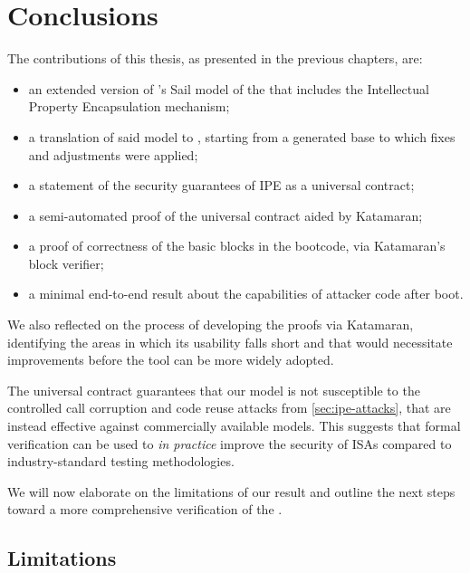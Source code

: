 \chapter{Conclusions}
\label{ch:conclusions}

The contributions of this thesis, as presented in the previous chapters, are:
\begin{itemize}
\item an extended version of \cite{mspthesis}'s Sail model of the \msp that includes the Intellectual Property Encapsulation mechanism;
\item a translation of said model to \usail, starting from a generated base to which fixes and adjustments were applied;
\item a statement of the security guarantees of IPE as a universal contract;
\item a semi-automated proof of the universal contract aided by Katamaran;
\item a proof of correctness of the basic blocks in the \msp bootcode, via Katamaran's block verifier;
\item a minimal end-to-end result about the capabilities of attacker code after boot.
\end{itemize}

We also reflected on the process of developing the proofs via Katamaran, identifying the areas in which its usability falls short and that would necessitate improvements before the tool can be more widely adopted.

The universal contract guarantees that our model is not susceptible to the controlled call corruption and code reuse attacks from \cref{sec:ipe-attacks}, that are instead effective against commercially available \msp models. This suggests that formal verification can be used to \emph{in practice} improve the security of ISAs compared to industry-standard testing methodologies. %

We will now elaborate on the limitations of our result and outline the next steps toward a more comprehensive verification of the \msp.

\section{Limitations}


